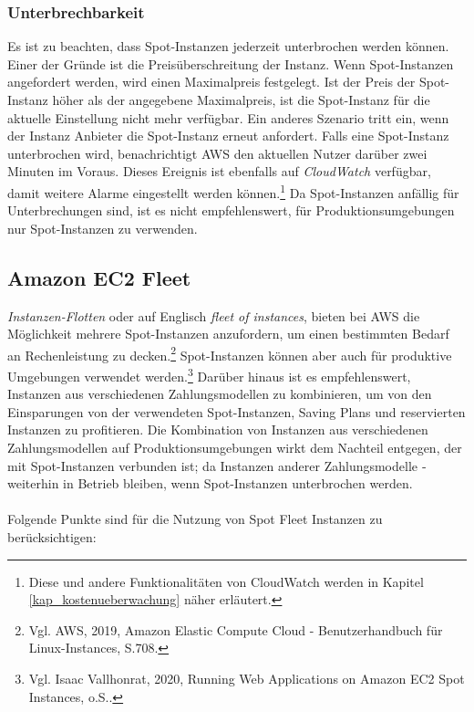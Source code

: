 \subsubsection*{Unterbrechbarkeit}
Es ist zu beachten, dass Spot-Instanzen jederzeit unterbrochen werden können. Einer der Gründe ist die Preisüberschreitung der Instanz. Wenn Spot-Instanzen angefordert werden, wird einen Maximalpreis festgelegt. Ist der Preis der Spot-Instanz höher als der angegebene Maximalpreis, ist die Spot-Instanz für die aktuelle Einstellung nicht mehr verfügbar. Ein anderes Szenario tritt ein, wenn der Instanz Anbieter die Spot-Instanz erneut anfordert. Falls eine Spot-Instanz unterbrochen wird, benachrichtigt AWS den aktuellen Nutzer darüber zwei Minuten im Voraus. Dieses Ereignis ist ebenfalls auf \textit{CloudWatch} verfügbar, damit weitere Alarme eingestellt werden können.\footnote{Diese und andere Funktionalitäten von CloudWatch werden in Kapitel \ref{kap_kostenueberwachung} näher erläutert.} Da Spot-Instanzen anfällig für Unterbrechungen sind, ist es nicht empfehlenswert, für Produktionsumgebungen nur Spot-Instanzen zu verwenden.


\subsection{Amazon EC2 Fleet} \label{sssec:AWS-EC2-Fleet}%
\textit{Instanzen-Flotten} oder auf Englisch \textit{fleet of instances}, bieten bei AWS die Möglichkeit mehrere Spot-Instanzen anzufordern, um einen bestimmten Bedarf an Rechenleistung zu decken.\footnote{Vgl. AWS, 2019, Amazon Elastic Compute Cloud - Benutzerhandbuch für Linux-Instances, S.708\cite{AMZ26}.} Spot-Instanzen können aber auch für produktive Umgebungen verwendet werden.\footnote{Vgl. Isaac Vallhonrat, 2020, Running Web Applications on Amazon EC2 Spot Instances, o.S.\cite{AMZ24}.} Darüber hinaus ist es empfehlenswert, Instanzen aus verschiedenen Zahlungsmodellen zu kombinieren, um von den Einsparungen von der verwendeten Spot-Instanzen, Saving Plans und reservierten Instanzen zu profitieren. Die Kombination von Instanzen aus verschiedenen Zahlungsmodellen auf Produktionsumgebungen wirkt dem Nachteil entgegen, der mit Spot-Instanzen verbunden ist; da Instanzen anderer Zahlungsmodelle ­­weiterhin in Betrieb bleiben, wenn Spot-Instanzen unterbrochen werden.
\\\\
Folgende Punkte sind für die Nutzung von Spot Fleet Instanzen zu berücksichtigen:
